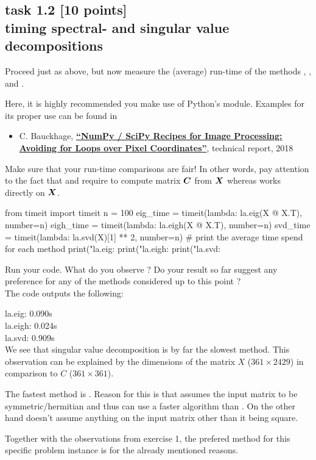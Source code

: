 
\subsection*{task 1.2 [10 points] \\[1ex] timing spectral- and singular value decompositions}

Proceed just as above, but now measure the (average) run-time of the methods , , and .

Here, it is highly recommended you make use of Python's  module. Examples for its proper use can be found in 
\begin{itemize}
\item[] C. Bauckhage, \href{https://www.researchgate.net/publication/329449786_NumPy_SciPy_Recipes_for_Image_Processing_Avoiding_for_Loops_over_Pixel_Coordinates}{\textbf{``NumPy / SciPy Recipes for Image Processing: Avoiding for Loops over Pixel Coordinates''}}, technical report, 2018 
\end{itemize}

Make sure that your run-time comparisons are fair! In other words, pay attention to the fact that  and  require to compute matrix $\bm{C}$ from $\bm{X}$ whereas  works directly on $\bm{X}$.
\begin{python}
from timeit import timeit
n = 100
eig_time = timeit(lambda: la.eig(X @ X.T), number=n)
eigh_time = timeit(lambda: la.eigh(X @ X.T), number=n)
svd_time = timeit(lambda: la.svd(X)[1] ** 2, number=n)
# print the average time spend for each method
print("la.eig:  %
print("la.eigh: %
print("la.svd:  %
\end{python}
\vspace{2cm}
Run your code. What do you observe ? Do your result so far suggest any preference for any of the methods considered up to this point ?
\color{blue} \\[1ex]
The code outputs the following:

la.eig:  0.090s \\
la.eigh: 0.024s \\
la.svd:  0.909s \\

We see that singular value decomposition is by far the slowest method. This observation can be explained by the dimensions of the matrix $X$ ($361 \times 2429$) in comparison to $C$ ($361 \times 361$). 

The fastest method is . Reason for this is that  assumes the input matrix to be symmetric/hermitian and thus can use a faster algorithm than . On the other hand  doesn't assume anything on the input matrix other than it being square.

Together with the observations from exercise 1, the prefered method for this specific problem instance is  for the already mentioned reasons.
\color{black}
\newpage



